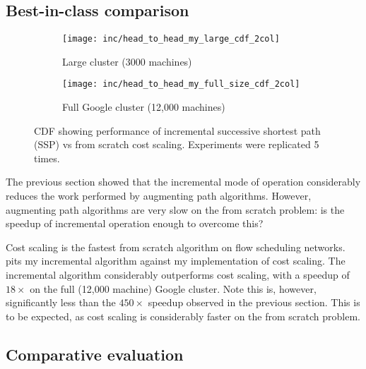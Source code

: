
\subsection{Best-in-class comparison}

\begin{figure}
    \begin{widepage}
        \begin{subfigure}[c]{0.5\textwidth}
            \texttt{[image: inc/head\_to\_head\_my\_large\_cdf\_2col]}
            \caption{Large cluster (3000 machines)}
        \end{subfigure}
        \begin{subfigure}[c]{0.5\textwidth}
            \texttt{[image: inc/head\_to\_head\_my\_full\_size\_cdf\_2col]}
            \caption{Full Google cluster (12,000 machines)}
        \end{subfigure}
    \end{widepage}
    \caption[Performance of incremental successive shortest path vs from scratch cost scaling]{CDF showing performance of incremental successive shortest path (SSP) vs from scratch cost scaling. Experiments were replicated 5 times.}
    \label{fig:inc-head-to-head-my}
\end{figure}

The previous section showed that the incremental mode of operation considerably reduces the work performed by augmenting path algorithms. However, augmenting path algorithms are very slow on the from scratch problem\footnotemark: is the speedup of incremental operation enough to overcome this?

Cost scaling is the fastest from scratch algorithm on flow scheduling networks.  pits my incremental algorithm against my implementation of cost scaling. The incremental algorithm considerably outperforms cost scaling, with a speedup of $18\times$ on the full (12,000 machine) Google cluster. Note this is, however, significantly less than the $450\times$ speedup observed in the previous section. This is to be expected, as cost scaling is considerably faster on the from scratch problem.

\subsection{Comparative evaluation}

